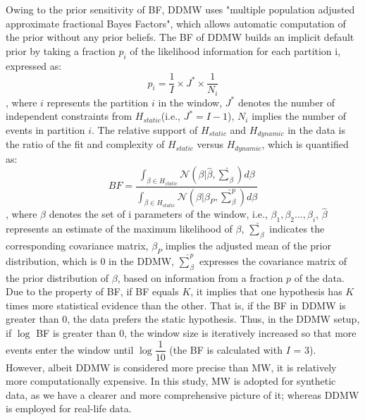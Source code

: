 \documentclass[]{interact}
\theoremstyle{plain}%
\theoremstyle{definition}
\theoremstyle{remark}
\begin{document}
Owing to the prior sensitivity of BF, DDMW uses "multiple population adjusted approximate fractional Bayes Factors", which allows automatic computation of the prior without any prior beliefs. The BF of DDMW builds an implicit default prior by taking a fraction $p_i$ of the likelihood information for each partition i, expressed as\cite{hoijtinkBayesianEvaluationInformative2019}:
\begin{equation} \label{6}
	p_i = \dfrac{1}{I} \times J^* \times \dfrac{1}{N_i}
\end{equation}
, where $i$ represents the partition $i$ in the window, $J^*$ denotes the number of independent constraints from $H_{static}$(i.e., $J^* = I - 1$), $N_i$ implies the number of events in partition $i$. The relative support of $H_{static}$ and $H_{dynamic}$ in the data is the ratio of the fit and complexity of $H_{static}$ versus $H_{dynamic}$, which is quantified as\cite{meijerink-bosmanDynamicRelationalEvent2022}: 
\begin{equation} \label{7}
	BF = \dfrac{\int_{\beta \in H_{static}} \mathcal{N}(\beta|\hat{\beta}, \hat{\sum}_{\beta}) d\beta}
	{\int_{\beta \in H_{static}} \mathcal{N}(\beta|\beta_P, \hat{\sum} ^p _{\beta}) d\beta}
\end{equation}
, where $\beta$ denotes the set of i parameters of the window, i.e., $\beta_1, \beta_2... , \beta_i$, $\hat{\beta}$ represents an estimate of the maximum likelihood of $\beta$, $\hat{\sum}_\beta$ indicates the corresponding covariance matrix, $\beta_P$ implies the adjusted mean of the prior distribution, which is 0 in the DDMW, $\hat{\sum} ^p _\beta$ expresses the covariance matrix of the prior distribution of $\beta$, based on information from a fraction $p$ of the data.\\

Due to the property of BF, if BF equals $K$, it implies that one hypothesis has $K$ times more statistical evidence than the other. That is, if the BF in DDMW is greater than 0, the data prefers the static hypothesis. Thus, in the DDMW setup, if $\log$ BF is greater than 0, the window size is iteratively increased so that more events enter the window until $\log\dfrac{1}{10}$ (the BF is calculated with $I$ = 3). \\

However, albeit DDMW is considered more precise than MW, it is relatively more computationally expensive. In this study, MW is adopted for synthetic data, as we have a clearer and more comprehensive picture of it; whereas DDMW is employed for real-life data. \\
\end{document}
